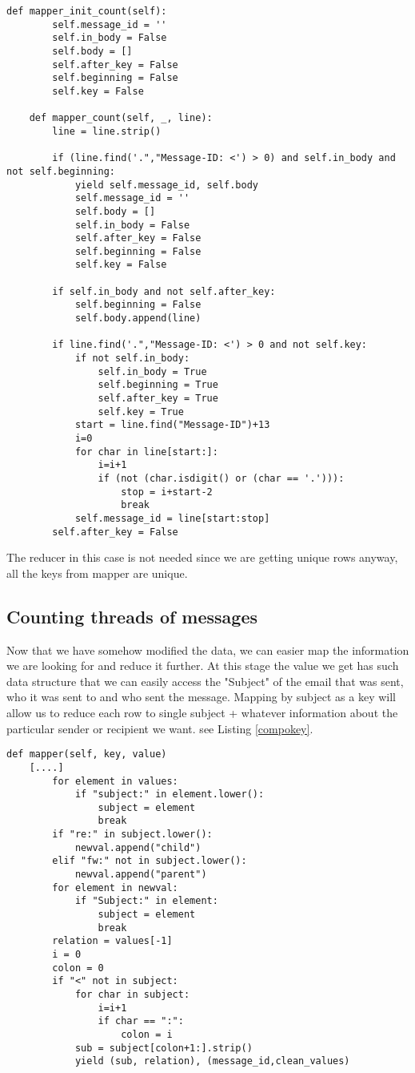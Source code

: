 \documentclass{llncs}
\begin{document}
\begin{lstlisting}[caption={First mapper that combines relevant lines into one big value}, label={manytoone}]
	def mapper_init_count(self):
		self.message_id = ''
		self.in_body = False
		self.body = []
		self.after_key = False
		self.beginning = False
		self.key = False

	def mapper_count(self, _, line):
		line = line.strip()

		if (line.find('.","Message-ID: <') > 0) and self.in_body and not self.beginning:
			yield self.message_id, self.body
			self.message_id = ''
			self.body = []
			self.in_body = False
			self.after_key = False
			self.beginning = False
			self.key = False

		if self.in_body and not self.after_key:
			self.beginning = False
			self.body.append(line)

		if line.find('.","Message-ID: <') > 0 and not self.key:
			if not self.in_body:
				self.in_body = True
				self.beginning = True
				self.after_key = True
				self.key = True
			start = line.find("Message-ID")+13
			i=0
			for char in line[start:]:
				i=i+1
				if (not (char.isdigit() or (char == '.'))):
					stop = i+start-2
					break
			self.message_id = line[start:stop]
		self.after_key = False

\end{lstlisting}

The reducer in this case is not needed since we are getting unique rows anyway, all the keys from mapper are unique.

\subsection{Counting threads of messages}
Now that we have somehow modified the data, we can easier map the information we are looking for and reduce it further. At this stage the value we get has such data structure that we can easily access the "Subject" of the email that was sent, who it was sent to and who sent the message. Mapping by subject as a key will allow us to reduce each row to single subject + whatever information about the particular sender or recipient we want. see Listing \ref{compokey}.
\begin{lstlisting}[caption={mapper that creates composite key\, in order to preserve the creator of the topic\, and conversation partner(s)}, label={compokey}]
	def mapper(self, key, value)
    [....]
		for element in values:
			if "subject:" in element.lower():
				subject = element
				break
		if "re:" in subject.lower():
			newval.append("child")
		elif "fw:" not in subject.lower():
			newval.append("parent")
		for element in newval:
			if "Subject:" in element:
				subject = element
				break
		relation = values[-1]
		i = 0
		colon = 0
		if "<" not in subject:
			for char in subject:
				i=i+1
				if char == ":":
					colon = i
			sub = subject[colon+1:].strip()
			yield (sub, relation), (message_id,clean_values)
\end{lstlisting}
\end{document}
